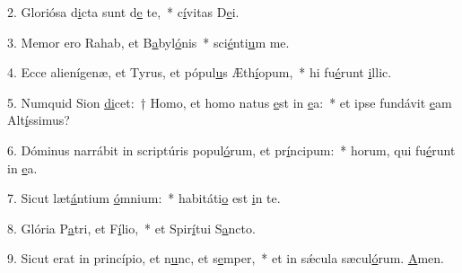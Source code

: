 2. Gloriósa d\uline{i}cta sunt d\uline{e} te,~* c\uline{í}vitas D\uline{e}i.\par 
3. Memor ero Rahab, et B\uline{a}byl\uline{ó}nis~* sci\uline{é}nti\uline{u}m me.\par 
4. Ecce alienígenæ, et Tyrus, et pópul\uline{u}s Æth\uline{í}opum,~* hi fu\uline{é}runt \uline{i}llic.\par 
5. Numquid Sion \uline{di}cet:~† Homo, et homo natus \uline{e}st in \uline{e}a:~* et ipse fundávit \uline{e}am Alt\uline{í}ssimus?\par 
6. Dóminus narrábit in scriptúris popul\uline{ó}rum, et pr\uline{í}ncipum:~* horum, qui fu\uline{é}runt in \uline{e}a.\par 
7. Sicut læt\uline{á}ntium \uline{ó}mnium:~* habitáti\uline{o} est \uline{i}n te.\par 
8. Glória P\uline{a}tri, et F\uline{í}lio,~* et Spir\uline{í}tui S\uline{a}ncto.\par 
9. Sicut erat in princípio, et n\uline{u}nc, et s\uline{e}mper,~* et in sǽcula sæcul\uline{ó}rum. \uline{A}men.\par 
